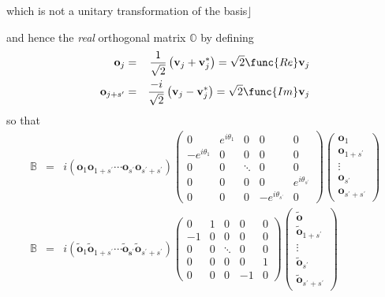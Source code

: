 \documentclass[aps,preprint]{revtex4}
\begin{document}
which is not a unitary transformation of the basis$\rfloor $

and hence the \emph{real} orthogonal matrix $\mathbb{O}$ by defining 
\begin{eqnarray}
\mathbf{o}_{j} &=&\frac{1}{\sqrt{2}}\left( \mathbf{v}_{j}+\mathbf{v}%
_{j}^{\ast }\right) =\sqrt{2}\func{Re}\mathbf{v}_{j}  \nonumber \\
\mathbf{o}_{j+s^{\prime }} &=&\frac{-i}{\sqrt{2}}\left( \mathbf{v}_{j}-%
\mathbf{v}_{j}^{\ast }\right) =\sqrt{2}\func{Im}\mathbf{v}_{j}
\end{eqnarray}%
so that 
\begin{eqnarray}
\mathbb{B} &=&i\left( \mathbf{o}_{1}\mathbf{o}_{1+s^{\prime }}\mathbf{\cdots
o}_{s^{\prime }}\mathbf{o}_{s^{\prime }+s^{\prime }}\right) \left( 
\begin{array}{ccccc}
0 & e^{i\theta _{1}} & 0 & 0 & 0 \\ 
-e^{i\theta _{1}} & 0 & 0 & 0 & 0 \\ 
0 & 0 & \ddots  & 0 & 0 \\ 
0 & 0 & 0 & 0 & e^{i\theta _{s^{\prime }}} \\ 
0 & 0 & 0 & -e^{i\theta _{s^{\prime }}} & 0%
\end{array}%
\right) \left( 
\begin{array}{c}
\mathbf{o}_{1} \\ 
\mathbf{o}_{1+s^{\prime }} \\ 
\mathbf{\vdots } \\ 
\mathbf{o}_{s^{\prime }} \\ 
\mathbf{o}_{s^{\prime }+s^{\prime }}%
\end{array}%
\right)   \nonumber \\
\mathbb{B} &=&i\left( \mathbf{\tilde{o}}_{1}\mathbf{\tilde{o}}_{1+s^{\prime
}}\mathbf{\cdots \tilde{o}}_{\mathbf{s^{\prime }}}\mathbf{\tilde{o}}%
_{s^{\prime }+s^{\prime }}\right) \left( 
\begin{array}{ccccc}
0 & 1 & 0 & 0 & 0 \\ 
-1 & 0 & 0 & 0 & 0 \\ 
0 & 0 & \ddots  & 0 & 0 \\ 
0 & 0 & 0 & 0 & 1 \\ 
0 & 0 & 0 & -1 & 0%
\end{array}%
\right) \left( 
\begin{array}{c}
\mathbf{\tilde{o}} \\ 
\mathbf{\tilde{o}}_{1+s^{\prime }} \\ 
\mathbf{\vdots } \\ 
\mathbf{\tilde{o}}_{s^{\prime }} \\ 
\mathbf{\tilde{o}}_{s^{\prime }+s^{\prime }}%
\end{array}%
\right)   \label{reex}
\end{eqnarray}%
\end{document}
